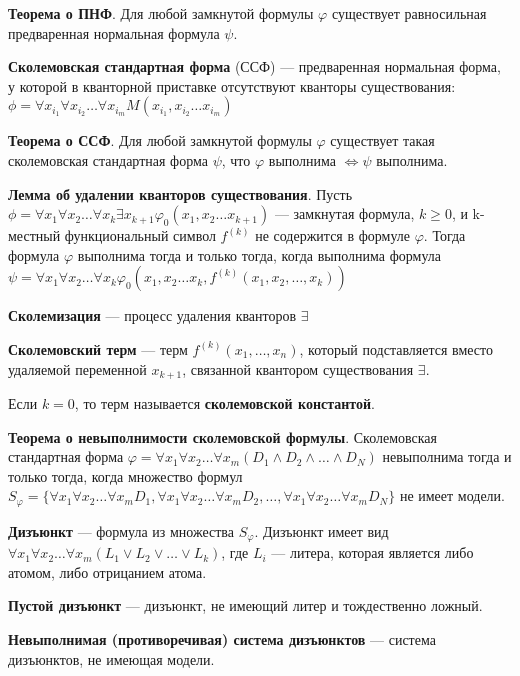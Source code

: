 \documentclass[a4paper,12pt]{article}
\begin{document}
\textbf{Теорема о ПНФ}. Для любой замкнутой формулы $\varphi$ существует равносильная предваренная нормальная формула $\psi$.

\textbf{Сколемовская стандартная форма} (ССФ) --- предваренная нормальная форма, у которой в кванторной приставке отсутствуют кванторы существования: $\phi = \forall x_{i_1} \forall x_{i_2} \dots \forall x_{i_m} M(x_{i_1}, x_{i_2} \dots x_{i_m})$

\textbf{Теорема о ССФ}. Для любой замкнутой формулы $\varphi$ существует такая сколемовская стандартная форма $\psi$, что $\varphi$ выполнима $\Leftrightarrow \psi$ выполнима.

\textbf{Лемма об удалении кванторов существования}. Пусть $\phi = \forall x_1 \forall x_2 \dots \forall x_k \exists x_{k+1}  \varphi_0 (x_1, x_2 \dots x_{k+1})$ --- замкнутая формула, $k \geqslant 0$, и k-местный функциональный символ $f^{(k)}$ не содержится в формуле $\varphi$. Тогда формула $\varphi$ выполнима тогда и только тогда, когда выполнима формула $\psi = \forall x_1 \forall x_2 \dots \forall x_k \varphi_0(x_1, x_2 \dots x_k, f^{(k)}(x_1, x_2, \dots, x_k))$

\textbf{Сколемизация} --- процесс удаления кванторов $\exists$

\textbf{Сколемовский терм} --- терм $f^{(k)}(x_1, \dots, x_n)$, который подставляется вместо удаляемой переменной $x_{k+1}$, связанной квантором существования $\exists$.

Если $k=0$, то терм называется \textbf{сколемовской константой}.

\textbf{Теорема о невыполнимости сколемовской формулы}. Сколемовская стандартная форма $\varphi = \forall x_1 \forall x_2 \dots \forall x_m (D_1 \wedge D_2 \wedge \dots \wedge D_N)$ невыполнима тогда и только тогда, когда множество формул $S_{\varphi} = \{\forall x_1 \forall x_2 \dots \forall x_m D_1, \forall x_1 \forall x_2 \dots \forall x_m D_2, \dots, \forall x_1 \forall x_2 \dots \forall x_m D_N\}$ не имеет модели.

\textbf{Дизъюнкт} --- формула из множества $S_{\varphi}$. Дизъюнкт имеет вид $\forall x_1 \forall x_2 \dots \forall x_m (L_1 \vee L_2 \vee \dots \vee L_k)$, где $L_i$ --- литера, которая является либо атомом, либо отрицанием атома.

\textbf{Пустой дизъюнкт} --- дизъюнкт, не имеющий литер и тождественно ложный.

\textbf{Невыполнимая (противоречивая) система дизъюнктов} --- система дизъюнктов, не имеющая модели.
\end{document}
